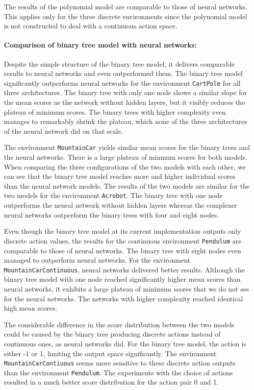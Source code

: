 The results of the polynomial model are comparable to those of neural networks. This applies only for the three discrete environments since the polynomial model is not constructed to deal with a continuous action space.

\paragraph*{Comparison of binary tree model with neural networks:} Despite the simple structure of the binary tree model, it delivers comparable results to neural networks and even outperformed them. The binary tree model significantly outperforms neural networks for the environment \verb|CartPole| for all three architectures. The binary tree with only one node shows a similar slope for the mean scores as the network without hidden layers, but it visibly reduces the plateau of minimum scores. The binary trees with higher complexity even manages to remarkably shrink the plateau, which none of the three architectures of the neural network did on that scale.

The environment \verb|MountainCar| yields similar mean scores for the binary trees and the neural networks. There is a large plateau of minmum scores for both models. When comparing the three configurations of the two models with each other, we can see that the binary tree model reaches more and higher individual scores than the neural network models. The results of the two models are similar for the two models for the environment \verb|Acrobot|. The binary tree with one node outperforms the neural network without hidden layers whereas the complexer neural networks outperform the binary trees with four and eight nodes.

Even though the binary tree model at its current implementation outputs only discrete action values, the results for the continuous environment \verb|Pendulum| are comparable to those of neural networks. The binary tree with eight nodes even managed to outperform neural networks. For the environment \verb|MountainCarContinuous|, neural networks delivered better results. Although the binary tree model with one node reached significantly higher mean scores than neural networks, it exhibits a large plateau of minimum scores that we do not see for the neural networks. The networks with higher complexity reached identical high mean scores.

The considerable difference in the score distribution between the two models could be caused by the binary tree producing discrete actions instead of continuous ones, as neural networks did. For the binary tree model, the action is either -1 or 1, limiting the output space significantly. The environment \verb|MountainCarContiuous| seems more sensitive to these discrete action outputs than the environment \verb|Pendulum|. The experiments with the choice of actions resulted in a much better score distribution for the action pair 0 and 1.

